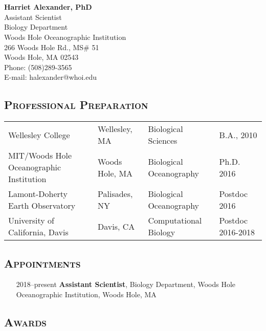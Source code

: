 \documentclass[svgnames,11pt]{article}
\date{}
\author{}
\let\origsection\section%
\let\section\subsubsection%
\let\section\origsection%
\begin{document}

\section*{}
\textbf{\large{Harriet Alexander, PhD}}\\
Assistant Scientist\\
Biology Department\\
Woods Hole Oceanographic Institution\\
266 Woods Hole Rd., MS\# 51\\
Woods Hole, MA 02543\\
Phone: (508)289-3565\\
E-mail: halexander@whoi.edu\\


\subsection*{\textsc{Professional Preparation}}

\begin{tabular}{ l l l l }
 Wellesley College & Wellesley, MA & Biological Sciences & B.A., 2010 \\
 MIT/Woods Hole Oceanographic Institution  & Woods Hole, MA & Biological Oceanography & Ph.D. 2016 \\
 Lamont-Doherty Earth Observatory & Palisades, NY & Biological Oceanography & Postdoc 2016 \\
 University of California, Davis & Davis, CA & Computational Biology & Postdoc 2016-2018 \\
\end{tabular}

\subsection*{\textsc{Appointments}}

\begin{itemize}[label={--9999:},leftmargin=*,itemsep=0pt]

    \item[2018--present]
        \textbf{Assistant Scientist},
        Biology Department, Woods Hole Oceanographic Institution, Woods Hole, MA

\end{itemize}

\subsection*{\textsc{Awards}}
\end{document}
